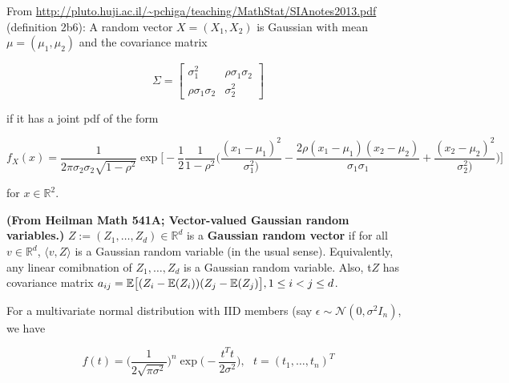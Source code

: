 \begin{definition} From \url{http://pluto.huji.ac.il/~pchiga/teaching/MathStat/SIAnotes2013.pdf} (definition 2b6): A random vector \(X = (X_1, X_2)\) is Gaussian with mean \(\mu = (\mu_1, \mu_2)\) and the covariance matrix

\[
\Sigma = \begin{bmatrix}
   \sigma_1^2 & \rho \sigma_1 \sigma_2 \\
     \rho \sigma_1 \sigma_2     &\sigma_2^2
\end{bmatrix}
\]

if it has a joint pdf of the form

\[
f_X(x) = \frac{1}{2 \pi \sigma_2 \sigma_2 \sqrt{1 - \rho^2}} \exp \bigg[ - \frac{1}{2} \frac{1}{1 - \rho^2} \bigg( \frac{(x_1 - \mu_1)^2}{\sigma_1^2)} - \frac{2 \rho (x_1 - \mu_1)(x_2 - \mu_2)}{\sigma_1 \sigma_1} +  \frac{(x_2 - \mu_2)^2}{\sigma_2^2)} \bigg) \bigg]
\]

for \(x \in \mathbb{R}^2\).
\end{definition}



\begin{definition} \textbf{(From Heilman Math 541A; Vector-valued Gaussian random variables.)} \(Z:= (Z_1, \ldots, Z_d) \in \mathbb{R}^d\) is a \textbf{Gaussian random vector} if for all \(v \in \mathbb{R}^d\), \(\langle v, Z\rangle\) is a Gaussian random variable (in the usual sense). Equivalently, any linear comibnation of \(Z_1, \ldots, Z_d\) is a Gaussian random variable. Also, t\(Z\) has covariance matrix \(a_{ij} = \E \big[(Z_i - \E(Z_i)) (Z_j - \E(Z_j)\big], 1 \leq i < j \leq d\).

\end{definition}

\begin{remark} For a multivariate normal distribution with IID members (say \(\epsilon \sim \mathcal{N}(0, \sigma^2 I_n)\), we have

\[
f(t) = \bigg( \frac{1}{2 \sqrt{\pi \sigma^2}}   \bigg)^n \exp \bigg( - \frac{t^T t}{2 \sigma^2} \bigg) , \ \ \ t = (t_1, \ldots, t_n)^T
\]

\end{remark}

